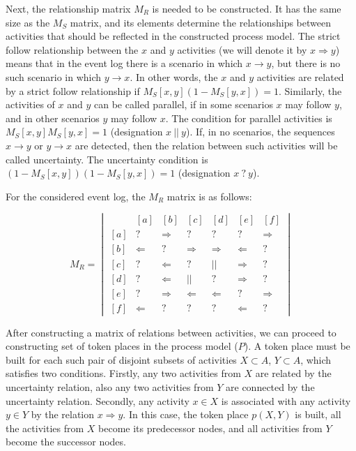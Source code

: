 \documentclass[
11pt,%
tightenlines,%
twoside,%
onecolumn,%
nofloats,%
nobibnotes,%
nofootinbib,%
superscriptaddress,%
noshowpacs,%
centertags]%
{revtex4}
\begin{document}
Next, the relationship matrix $M_R$ is needed to be constructed.
It has the same size as the $M_S$ matrix, and its elements determine the relationships between activities that should be reflected in the constructed process model.
The strict follow relationship between the $x$ and $y$ activities (we will denote it by $x \Rightarrow y$) means that in the event log there is a scenario in which $x \rightarrow y$, but there is no such scenario in which $y \rightarrow x$.
In other words, the $x$ and $y$ activities are related by a strict follow relationship if $M_S[x, y](1 - M_S[y, x]) = 1$.
Similarly, the activities of $x$ and $y$ can be called parallel, if in some scenarios $x$ may follow $y$, and in other scenarios $y$ may follow $x$.
The condition for parallel activities is $M_S[x, y]M_S[y, x] = 1$ (designation $x \ || \ y$).
If, in no scenarios, the sequences $x \rightarrow y$ or $y \rightarrow x$ are detected, then the relation between such activities will be called uncertainty.
The uncertainty condition is $(1 - M_S[x, y])(1 - M_S[y, x]) = 1$ (designation $x \ ? \ y$).

For the considered event log, the $M_R$ matrix is as follows:

\begin{equation}\label{eqn:r}
M_R = \begin{vmatrix}
\ & [a] & [b] & [c] & [d] & [e] & [f] \\
[a] & ? & \Rightarrow & ? & ? & ? & \Rightarrow \\ 
[b] & \Leftarrow & ? & \Rightarrow & \Rightarrow & \Leftarrow & ? \\
[c] & ? & \Leftarrow & ? & || & \Rightarrow & ? \\
[d] & ? & \Leftarrow & || & ? & \Rightarrow & ? \\
[e] & ? & \Rightarrow & \Leftarrow & \Leftarrow & ? & \Rightarrow \\
[f] & \Leftarrow & ? & ? & ? & \Leftarrow & ?
\end{vmatrix}
\end{equation}

After constructing a matrix of relations between activities, we can proceed to constructing set of token places in the process model ($P$).
A token place must be built for each such pair of disjoint subsets of activities $X \subset A$, $Y \subset A$, which satisfies two conditions.
Firstly, any two activities from $X$ are related by the uncertainty relation, also any two activities from $Y$ are connected by the uncertainty relation.
Secondly, any activity $x \in X$ is associated with any activity $y \in Y$ by the relation $x \Rightarrow y$.
In this case, the token place $p(X, Y)$ is built, all the activities from $X$ become its predecessor nodes, and all activities from $Y$ become the successor nodes.
\end{document}
